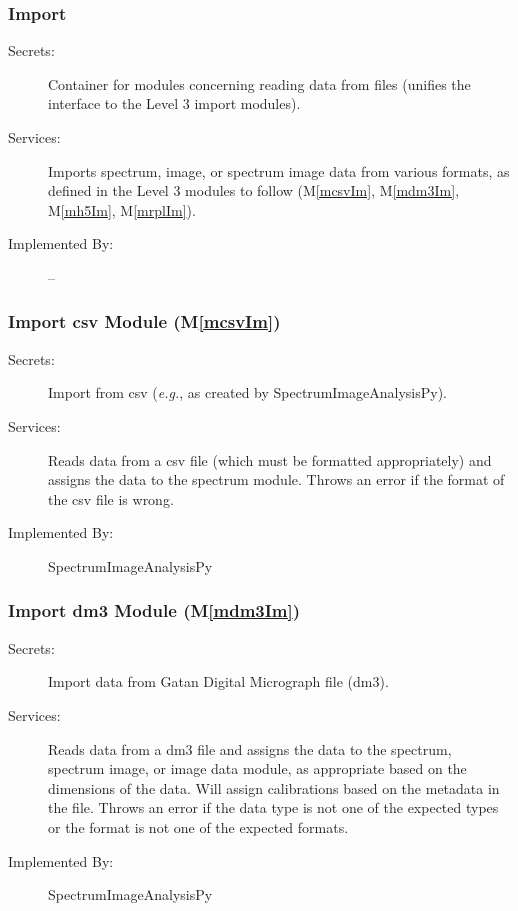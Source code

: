 \documentclass[12pt, titlepage]{article}
\newcommand{\mref}[1]{M\ref{#1}}
\newcommand{\progname}{SpectrumImageAnalysisPy}
\begin{document}
\subsubsection{Import}
\label{sssec:Import}
\begin{description}
	\item[Secrets:]Container for modules concerning reading data from files
    (unifies the interface to the Level 3 import modules).
	\item[Services:]Imports spectrum, image, or spectrum image data from various
formats, as defined in the Level 3 modules to follow (\mref{mcsvIm},
\mref{mdm3Im}, \mref{mh5Im}, \mref{mrplIm}). 
	\item[Implemented By:] --
\end{description}

\subsubsection{Import csv Module (\mref{mcsvIm})}
\label{sssec:ImportCSV}
\begin{description}
	\item[Secrets:]Import from csv (\textit{e.g.}, as created by \progname).
	\item[Services:]Reads data from a csv file (which must be formatted
appropriately) and assigns the data to the spectrum module. Throws an error if
the format of the csv file is wrong.
	\item[Implemented By:] \progname
\end{description}

\subsubsection{Import dm3 Module (\mref{mdm3Im})}
\label{sssec:ImportDM3}
\begin{description}
	\item[Secrets:]Import data from Gatan Digital Micrograph file (dm3).
	\item[Services:]Reads data from a dm3 file and assigns the data to the
spectrum, spectrum image, or image data module, as appropriate based on the
dimensions of the data. Will assign calibrations based on the metadata in the
file. Throws an error if the data type is not one of the expected types or the
format is not one of the expected formats.
	\item[Implemented By:] \progname
\end{description}
\end{document}
